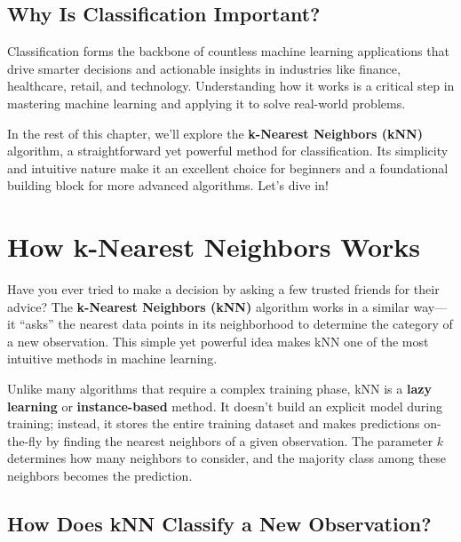 \documentclass[
]{book}
\theoremstyle{definition}
\theoremstyle{definition}
\theoremstyle{definition}
\theoremstyle{definition}
\theoremstyle{remark}
\begin{document}
\subsection*{Why Is Classification Important?}\label{why-is-classification-important}

Classification forms the backbone of countless machine learning applications that drive smarter decisions and actionable insights in industries like finance, healthcare, retail, and technology. Understanding how it works is a critical step in mastering machine learning and applying it to solve real-world problems.

In the rest of this chapter, we'll explore the \textbf{k-Nearest Neighbors (kNN)} algorithm, a straightforward yet powerful method for classification. Its simplicity and intuitive nature make it an excellent choice for beginners and a foundational building block for more advanced algorithms. Let's dive in!

\section{How k-Nearest Neighbors Works}\label{how-k-nearest-neighbors-works}

Have you ever tried to make a decision by asking a few trusted friends for their advice? The \textbf{k-Nearest Neighbors (kNN)} algorithm works in a similar way---it ``asks'' the nearest data points in its neighborhood to determine the category of a new observation. This simple yet powerful idea makes kNN one of the most intuitive methods in machine learning.

Unlike many algorithms that require a complex training phase, kNN is a \textbf{lazy learning} or \textbf{instance-based} method. It doesn't build an explicit model during training; instead, it stores the entire training dataset and makes predictions on-the-fly by finding the nearest neighbors of a given observation. The parameter \(k\) determines how many neighbors to consider, and the majority class among these neighbors becomes the prediction.

\subsection*{How Does kNN Classify a New Observation?}\label{how-does-knn-classify-a-new-observation}
\end{document}
